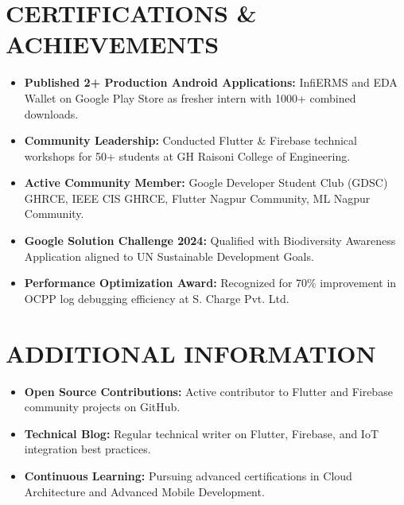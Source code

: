 \documentclass[a4paper,11pt]{article}
\begin{document}
\section{CERTIFICATIONS \& ACHIEVEMENTS}

\begin{itemize}[leftmargin=*,noitemsep,topsep=2pt,itemsep=2pt]
    \item \textbf{Published 2+ Production Android Applications:} InfiERMS and EDA Wallet on Google Play Store as fresher intern with 1000+ combined downloads.
    \item \textbf{Community Leadership:} Conducted Flutter \& Firebase technical workshops for 50+ students at GH Raisoni College of Engineering.
    \item \textbf{Active Community Member:} Google Developer Student Club (GDSC) GHRCE, IEEE CIS GHRCE, Flutter Nagpur Community, ML Nagpur Community.
    \item \textbf{Google Solution Challenge 2024:} Qualified with Biodiversity Awareness Application aligned to UN Sustainable Development Goals.
    \item \textbf{Performance Optimization Award:} Recognized for 70\% improvement in OCPP log debugging efficiency at S. Charge Pvt. Ltd.
\end{itemize}
\vspace{-2mm}

\section{ADDITIONAL INFORMATION}

\begin{itemize}[leftmargin=*,noitemsep,topsep=2pt,itemsep=2pt]
    \item \textbf{Open Source Contributions:} Active contributor to Flutter and Firebase community projects on GitHub.
    \item \textbf{Technical Blog:} Regular technical writer on Flutter, Firebase, and IoT integration best practices.
    \item \textbf{Continuous Learning:} Pursuing advanced certifications in Cloud Architecture and Advanced Mobile Development.
\end{itemize}
\end{document}
